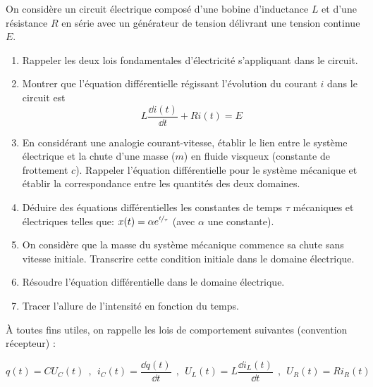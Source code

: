 \bexo

On considère un circuit électrique composé d'une bobine d'inductance $L$ et d'une
résistance $R$ en série avec un générateur de tension délivrant une tension continue $E$.

\begin{center}
\end{center}

\begin{enumerate}
	\item Rappeler les deux lois fondamentales d'électricité s'appliquant dans le circuit.
	\item Montrer que l'équation différentielle régissant l'évolution du courant $i$ dans le
		circuit est \[L\frac{\dd i(t)}{\dd t} + Ri(t) = E\]
	\item En considérant une analogie courant-vitesse, établir le lien entre le système
		électrique et la chute d'une masse ($m$) en fluide visqueux (constante de frottement
		$c$). Rappeler l'équation différentielle pour le système mécanique et établir la
		correspondance entre les quantités des deux domaines.
	\item Déduire des équations différentielles les constantes de temps $\tau$ mécaniques et
		électriques telles que: $x(t) = \alpha e^{\nicefrac{t}{\tau}}$ (avec $\alpha$ une constante).
	\item On considère que la masse du système mécanique commence sa chute sans vitesse
		initiale. Transcrire cette condition initiale dans le domaine électrique.
	\item Résoudre l'équation différentielle dans le domaine électrique.
	\item Tracer l'allure de l'intensité en fonction du temps.
\end{enumerate}

À toutes fins utiles, on rappelle les lois de comportement suivantes (convention
récepteur) :

\begin{equation*}
	q(t) = CU_C(t) ~~,~~ i_C(t) = \frac{\dd q(t)}{\dd t} ~~,~~ U_L(t) = L\frac{\dd i_L(t)}{\dd t} ~~,~~ U_R(t)
	= Ri_R(t)
\end{equation*}

\bigskip

\eexo
